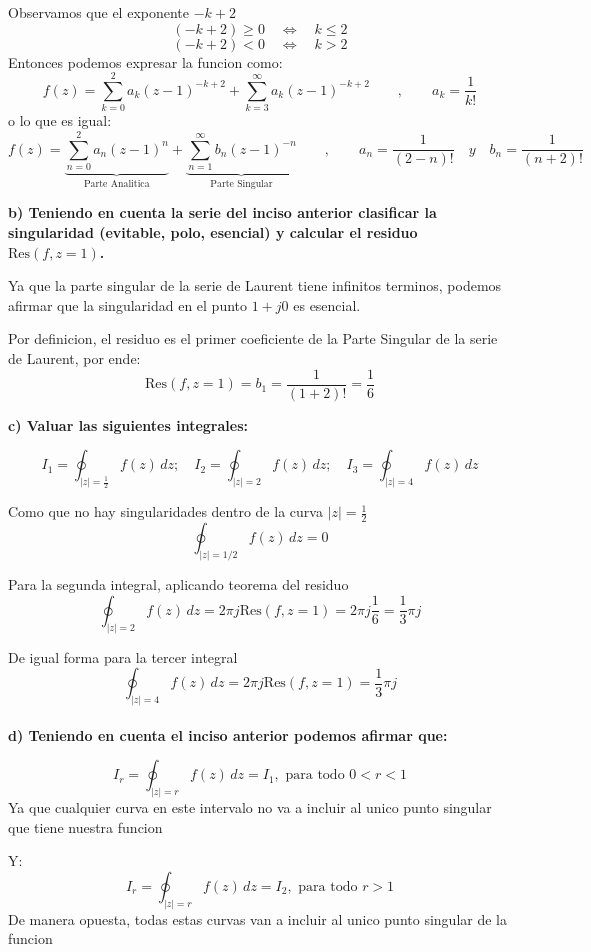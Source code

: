\documentclass[12pt]{report}
\begin{document}
Observamos que el exponente $-k+2$
$$(-k+2) \geq 0 \quad \Leftrightarrow \quad k \leq 2$$
$$(-k+2) < 0 \quad \Leftrightarrow \quad k>2$$
Entonces podemos expresar la funcion como:
$$f(z) = \sum_{k=0}^{2}a_k(z - 1)^{-k+2} + \sum_{k=3}^{\infty}a_k(z - 1)^{-k+2}\qquad, \qquad a_k=\frac{1}{k!}$$
o lo que es igual:
$$f(z) = \underbrace{\sum_{n=0}^{2}a_n(z - 1)^{n}}_{\text{Parte Analitica}} + \underbrace{\sum_{n=1}^{\infty}b_n(z - 1)^{-n}}_{\text{Parte Singular}}
\qquad, \qquad a_n=\frac{1}{(2-n)!}\quad y \quad b_n=\frac{1}{(n+2)!}$$

\textbf{b)  Teniendo en cuenta la serie del inciso anterior clasificar la singularidad (evitable, polo, 
esencial) y calcular el residuo \( \text{Res}(f, z = 1) \).}

Ya que la parte singular de la serie de Laurent tiene infinitos terminos, podemos afirmar que la singularidad
en el punto $1+j0$ es esencial.

Por definicion, el residuo es el primer coeficiente de la Parte Singular de la serie de Laurent, por ende:
$$\text{Res}(f, z = 1) = b_1=\frac{1}{(1+2)!} = \frac{1}{6}$$

\textbf{c)  Valuar las siguientes integrales:}

$$ I_1 = \oint_{|z| =\frac{1}{2}} f(z) \, dz; \quad I_2 = \oint_{|z| = 2} f(z) \, dz; \quad I_3 = \oint_{|z| = 4} f(z) \, dz $$

Como que no hay singularidades dentro de la curva $|z|=\frac{1}{2}$
$$\oint_{|z| = 1/2} f(z) \, dz = 0$$

Para la segunda integral, aplicando teorema del residuo
$$\oint_{|z| = 2} f(z) \, dz = 2\pi j \text{Res}(f, z = 1) = 2\pi j\frac{1}{6}=\frac{1}{3}\pi j$$

De igual forma para la tercer integral
$$\oint_{|z| = 4} f(z) \, dz = 2\pi j \text{Res}(f, z = 1) =\frac{1}{3}\pi j$$\\

\textbf{d)  Teniendo en cuenta el inciso anterior podemos afirmar que:}

$$ I_r = \oint_{|z| = r} f(z) \, dz = I_1, \text{ para todo } 0 < r < 1 $$ 
Ya que cualquier curva en este intervalo no va a incluir al unico punto singular que tiene nuestra funcion

Y:
$$ I_r = \oint_{|z| = r} f(z) \, dz = I_2, \text{ para todo } r > 1 $$ 
De manera opuesta, todas estas curvas van a incluir al unico punto singular de la funcion

\chapter{}%
\end{document}

